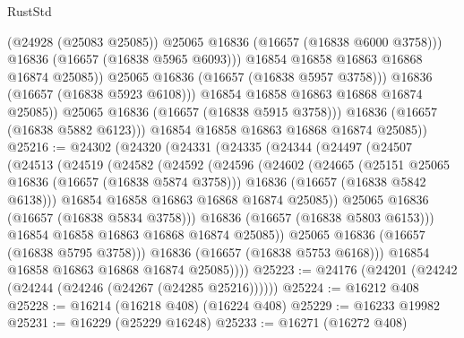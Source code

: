 \begin{lexlean}{RustStd}
\begin{coremodule}
                            (@24928 (@25083 @25085))
                            @25065
                            @16836
                            (@16657 (@16838 @6000 @3758)))
                          @16836
                          (@16657 (@16838 @5965 @6093)))
                        @16854
                        @16858
                        @16863
                        @16868
                        @16874
                        @25085))
                    @25065
                    @16836
                    (@16657 (@16838 @5957 @3758)))
                  @16836
                  (@16657 (@16838 @5923 @6108)))
                @16854
                @16858
                @16863
                @16868
                @16874
                @25085))
            @25065
            @16836
            (@16657 (@16838 @5915 @3758)))
          @16836
          (@16657 (@16838 @5882 @6123)))
        @16854
        @16858
        @16863
        @16868
        @16874
        @25085))
@25216 := @24302
    (@24320
      (@24331
        (@24335
          (@24344
            (@24497
              (@24507
                (@24513
                  (@24519
                    (@24582
                      (@24592
                        (@24596
                          (@24602
                            (@24665
                              (@25151 @25065 @16836 (@16657 (@16838 @5874 @3758)))
                              @16836
                              (@16657 (@16838 @5842 @6138)))
                            @16854
                            @16858
                            @16863
                            @16868
                            @16874
                            @25085))
                        @25065
                        @16836
                        (@16657 (@16838 @5834 @3758)))
                      @16836
                      (@16657 (@16838 @5803 @6153)))
                    @16854
                    @16858
                    @16863
                    @16868
                    @16874
                    @25085))
                @25065
                @16836
                (@16657 (@16838 @5795 @3758)))
              @16836
              (@16657 (@16838 @5753 @6168)))
            @16854
            @16858
            @16863
            @16868
            @16874
            @25085))))
@25223 := @24176 (@24201 (@24242 (@24244 (@24246 (@24267 (@24285 @25216))))))
@25224 := @16212 @408
@25228 := @16214 (@16218 @408) (@16224 @408)
@25229 := @16233 @19982
@25231 := @16229 (@25229 @16248)
@25233 := @16271 (@16272 @408)

\end{coremodule}
\end{lexlean}
